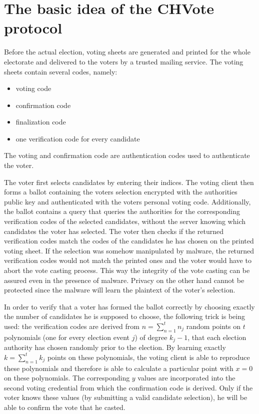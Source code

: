 \documentclass[a4paper,12pt]{report}
\begin{document}
\section{The basic idea of the CHVote protocol}
Before the actual election, voting sheets are generated and printed for the whole electorate and delivered to the voters by a trusted mailing service. The voting sheets contain several codes, namely:

\begin{itemize}
	\item voting code
	\item confirmation code
	\item finalization code
	\item one verification code for every candidate
\end{itemize}

The voting and confirmation code are authentication codes used to authenticate the voter.

The voter first selects candidates by entering their indices. The voting client then forms a ballot containing the voters selection encrypted with the authorities public key and authenticated with the voters personal voting code. Additionally, the ballot contains a query that queries the authorities for the corresponding verification codes of the selected candidates, without the server knowing which candidates the voter has selected. The voter then checks if the returned verification codes match the codes of the candidates he has chosen on the printed voting sheet. If the selection was somehow manipulated by malware, the returned verification codes would not match the printed ones and the voter would have to abort the vote casting process. This way the integrity of the vote casting can be assured even in the presence of malware. Privacy on the other hand cannot be protected since the malware will learn the plaintext of the voter's selection.

In order to verify that a voter has formed the ballot correctly by choosing exactly the number of candidates he is supposed to choose, the following trick is being used: the verification codes are derived from $n = \sum_{n=1}^{t} n_j$ random points on $t$ polynomials (one for every election event $j$) of degree $k_j - 1$, that each election authority has chosen randomly prior to the election. By learning exactly $k = \sum_{n=1}^{t} k_j$ points on these polynomials, the voting client is able to reproduce these polynomials and therefore is able to calculate a particular point with $x=0$ on these polynomials. The corresponding $y$ values are incorporated into the second voting credential from which the confirmation code is derived. Only if the voter knows these values (by submitting a valid candidate selection), he will be able to confirm the vote that he casted.
\end{document}
